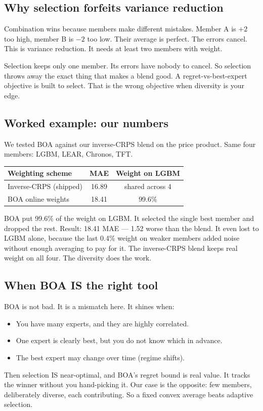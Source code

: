 \subsection{Why selection forfeits variance reduction}

Combination wins because members make different mistakes.
Member A is $+2$ too high, member B is $-2$ too low.
Their average is perfect. The errors cancel.
This is variance reduction. It needs at least two members with weight.

Selection keeps only one member. Its errors have nobody to cancel.
So selection throws away the exact thing that makes a blend good.
A regret-vs-best-expert objective is built to select.
That is the wrong objective when diversity is your edge.

\subsection{Worked example: our numbers}

We tested BOA against our inverse-CRPS blend on the price product.
Same four members: LGBM, LEAR, Chronos, TFT.

\begin{tabular}{lcc}
\hline
Weighting scheme & MAE & Weight on LGBM \\
\hline
Inverse-CRPS (shipped) & 16.89 & shared across 4 \\
BOA online weights & 18.41 & 99.6\% \\
\hline
\end{tabular}

\vspace{0.5em}
BOA put 99.6\% of the weight on LGBM.
It selected the single best member and dropped the rest.
Result: 18.41 MAE --- 1.52 worse than the blend.
It even lost to LGBM alone, because the last 0.4\% weight
on weaker members added noise without enough averaging to pay for it.
The inverse-CRPS blend keeps real weight on all four.
The diversity does the work.

\subsection{When BOA IS the right tool}

BOA is not bad. It is a mismatch here. It shines when:
\begin{itemize}
\item You have many experts, and they are highly correlated.
\item One expert is clearly best, but you do not know which in advance.
\item The best expert may change over time (regime shifts).
\end{itemize}
Then selection IS near-optimal, and BOA's regret bound is real value.
It tracks the winner without you hand-picking it.
Our case is the opposite: few members, deliberately diverse,
each contributing. So a fixed convex average beats adaptive selection.

